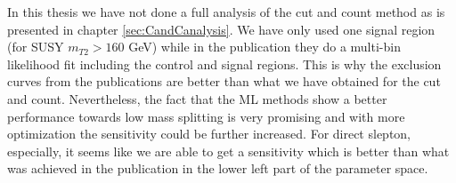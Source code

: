 In this thesis we have not done a full analysis of the cut and count method as is presented in chapter \ref{sec:CandCanalysis}. We have only used one signal region (for SUSY $m_{T2} > 160$ GeV) while in the publication they do a multi-bin likelihood fit including the control and signal regions. This is why the exclusion curves from the publications are better than what we have obtained for the cut and count. Nevertheless, the fact that the ML methods show a better performance towards low mass splitting is very promising and with more optimization the sensitivity could be further increased. For direct slepton, especially, it seems like we are able to get a sensitivity which is better than what was achieved in the publication in the lower left part of the parameter space.

